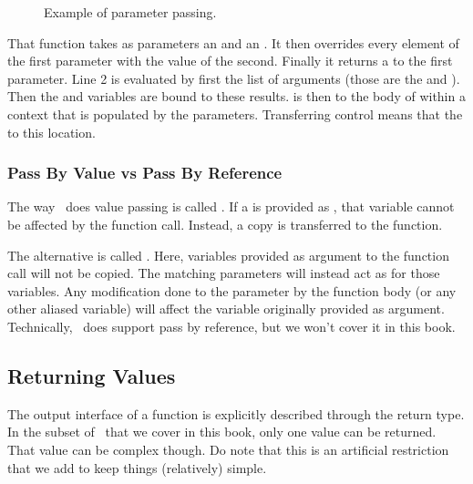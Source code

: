 \begin{figure}[tbp]
  
  \caption{Example of parameter passing.}
  \label{fig:fun:parampassing}
\end{figure}

That function takes as parameters an  and an . It then overrides every element of the first parameter with the value of the second. Finally it returns a  to the first parameter. Line 2 is evaluated by first  the list of arguments (those are the   and ). Then the  and  variables are bound to these results.  is then  to the body of  within a context that is populated by the parameters. Transferring control means that the   to this location.

\subsubsection{Pass By Value vs Pass By Reference}

The way \csharp\ does value passing is called . If a  is provided as , that variable cannot be affected by the function call. Instead, a copy is transferred to the function.

The alternative is called . Here, variables provided as argument to the function call will not be copied. The matching parameters will instead act as  for those variables. Any modification done to the parameter by the function body (or any other aliased variable) will affect the variable originally provided as argument. Technically, \csharp\ does support pass by reference, but we won't cover it in this book.

\subsection{Returning Values}

The output interface of a function is explicitly described through the return type. In the subset of \csharp\ that we cover in this book, only one value can be returned. That value can be complex though. Do note that this is an artificial restriction that we add to keep things (relatively) simple.

